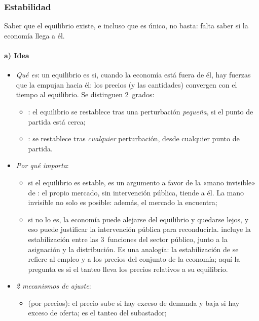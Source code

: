 \documentclass[11pt]{article}
\begin{document}
\subsubsection{Estabilidad}\label{sec:estabilidad}

Saber que el equilibrio existe, e incluso que es único, no basta: falta saber si la economía llega a él.

\paragraph{a) Idea}

\begin{itemize}
\item \emph{Qué es}: un equilibrio es  si, cuando la economía está fuera de él, hay fuerzas que la empujan hacia él: los precios (y las cantidades) convergen con el tiempo al equilibrio. Se distinguen 2~grados:
  \begin{itemize}
  \item {}: el equilibrio se restablece tras una perturbación \emph{pequeña}, si el punto de partida está cerca;
  \item {}: se restablece tras \emph{cualquier} perturbación, desde cualquier punto de partida.
  \end{itemize}
\item \emph{Por qué importa}:
  \begin{itemize}
  \item si el equilibrio es estable, es un argumento a favor de la «mano invisible» de : el propio mercado, sin intervención pública, tiende a él. La mano invisible no solo es posible: además, el mercado la encuentra;
  \item si no lo es, la economía puede alejarse del equilibrio y quedarse lejos, y eso puede justificar la intervención pública para reconducirla. \textcite{Musgrave1959Theory} incluye la estabilización entre las 3~funciones del sector público, junto a la asignación y la distribución. Es una analogía: la estabilización de  se refiere al empleo y a los precios del conjunto de la economía; aquí la pregunta es si el tanteo lleva los precios relativos a su equilibrio.
  \end{itemize}
\item \emph{2 mecanismos de ajuste}:
  \begin{itemize}
  \item {} (por precios): el precio sube si hay exceso de demanda y baja si hay exceso de oferta; es el tanteo del subastador;

\end{itemize}
\end{itemize}
\end{document}
